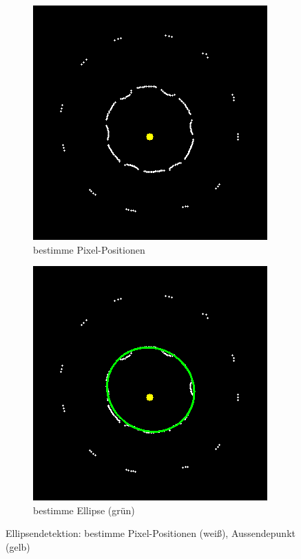 \begin{figure}[!htb]
	\centering
	\begin{subfigure}{.5\textwidth}
		\centering
		\includegraphics[width=.9\textwidth]{images/rayCast0.png}
		\caption{bestimme Pixel-Positionen}
		\label{fig:rayCastWOE}
	\end{subfigure}%
	\begin{subfigure}{.5\textwidth}
		\centering
		\includegraphics[width=.9\textwidth]{images/rayCast0Ellipse.png}
		\caption{bestimme Ellipse (grün)}
		\label{fig:rayCastWE}
	\end{subfigure}
	\caption{Ellipsendetektion: bestimme Pixel-Positionen (weiß), Aussendepunkt (gelb)}
	\label{fig:rayCast}
\end{figure}

